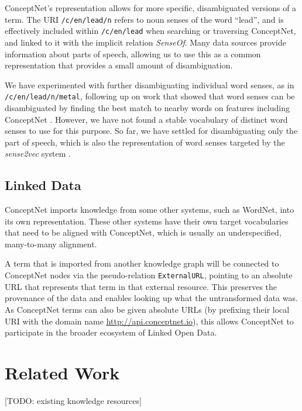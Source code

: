 \documentclass[letterpaper]{article}
\begin{document}
ConceptNet's representation allows for more specific, disambiguated
versions of a term. The URI \texttt{/c/en/lead/n} refers to noun senses
of the word ``lead'', and is effectively included within
\texttt{/c/en/lead} when searching or traversing ConceptNet, and
linked to it with the implicit relation \emph{SenseOf}. Many data
sources provide information about parts of speech, allowing us to use
this as a common representation that provides a small amount of
disambiguation.

We have experimented with further disambiguating individual word senses, as in
\texttt{/c/en/lead/n/metal}, following up on work that showed that word senses
can be disambiguated by finding the best match to nearby words on features
including ConceptNet \cite{havasi2010coarse}. However, we have not found a
stable vocabulary of distinct word senses to use for this purpose. So far,
we have settled for disambiguating only the part of speech, which is also the
representation of word senses targeted by the \emph{sense2vec} system
\cite{trask2015sense2vec}.

\subsection{Linked Data}

ConceptNet imports knowledge from some other systems, such as WordNet, into its
own representation. These other systems have their own target vocabularies that
need to be aligned with ConceptNet, which is usually an underspecified,
many-to-many alignment.

A term that is imported from another knowledge graph will be connected to
ConceptNet nodes via the pseudo-relation \texttt{ExternalURL}, pointing to an
absolute URL that represents that term in that external resource.  This
preserves the provenance of the data and enables looking up what the
untransformed data was.  As ConceptNet terms can also be given absolute URLs
(by prefixing their local URI with the domain name
\url{http://api.conceptnet.io}), this allows ConceptNet to participate in the
broader ecosystem of Linked Open Data.

\section{Related Work}

[TODO: existing knowledge resources]

\end{document}
